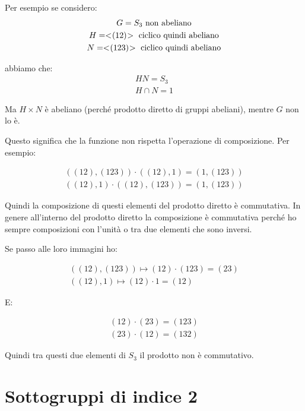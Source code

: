 \begin{soluzione}
	Per esempio se considero:
	\begin{gather*}
		G = S_3 \text{ non abeliano} \\
		H = < \negmedspace (12) \negmedspace > \text{ ciclico quindi abeliano} \\
		N = < \negmedspace (123) \negmedspace > \text{ ciclico quindi abeliano}
	\end{gather*}

	abbiamo che:
	\begin{gather*}
		HN = S_3 \\
		H \cap N = 1
	\end{gather*}

	Ma $H \times N$ è abeliano (perché prodotto diretto di gruppi abeliani), mentre $G$ non lo è.
	
	Questo significa che la funzione non rispetta l'operazione di composizione.
	Per esempio:
	
	\begin{gather}
		((12), (123)) \cdot ((12), 1) = (1, (123)) \\
		((12), 1) \cdot ((12), (123)) = (1, (123))
	\end{gather}

	Quindi la composizione di questi elementi del prodotto diretto è commutativa.
	In genere all'interno del prodotto diretto la composizione è commutativa perché ho sempre composizioni con l'unità
	o tra due elementi che sono inversi.
	
	Se passo alle loro immagini ho:
	
	\begin{gather}
		((12), (123)) \longmapsto (12) \cdot (123) = (23) \\
		((12), 1) \longmapsto (12) \cdot 1 = (12)
	\end{gather}

	E:
	
	\begin{gather}
		(12) \cdot (23) = (123) \\
		(23) \cdot (12) = (132)
	\end{gather}

	Quindi tra questi due elementi di $S_3$ il prodotto non è commutativo.
	
\end{soluzione}

\section{Sottogruppi di indice 2}

